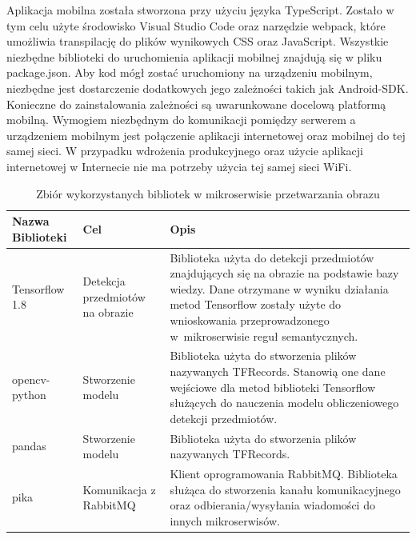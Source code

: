 Aplikacja mobilna została stworzona przy użyciu języka TypeScript. Zostało w tym celu użyte środowisko Visual Studio Code oraz narzędzie webpack, które umożliwia transpilację do plików wynikowych CSS oraz JavaScript. Wszystkie niezbędne biblioteki do uruchomienia aplikacji mobilnej znajdują się w pliku package.json. Aby kod mógł zostać uruchomiony na urządzeniu mobilnym, niezbędne jest dostarczenie dodatkowych jego zależności takich jak Android-SDK. Konieczne do zainstalowania zależności są uwarunkowane docelową platformą mobilną. Wymogiem niezbędnym do komunikacji pomiędzy serwerem a urządzeniem mobilnym jest połączenie aplikacji internetowej oraz mobilnej do tej samej sieci. W przypadku wdrożenia produkcyjnego oraz użycie aplikacji internetowej w Internecie nie ma potrzeby użycia tej samej sieci WiFi.
\newpage


\begin{center}
	\begin{longtable}{ | p{3.1cm} | p{4cm} | p{6.5cm} |}
		\caption{Zbiór wykorzystanych bibliotek w mikroserwisie przetwarzania obrazu}
		\label{librariesPython} \\
		\hline Nazwa \newline Biblioteki & Cel & Opis \\ \hline    
		
		\hline Tensorflow 1.8 &
		Detekcja przedmiotów na obrazie
		
		& Biblioteka użyta do detekcji przedmiotów znajdujących się na obrazie na podstawie bazy wiedzy. Dane otrzymane w wyniku działania metod Tensorflow zostały użyte do wnioskowania przeprowadzonego w~mikroserwisie reguł semantycznych.\\ \hline


	\hline opencv-python &
	Stworzenie modelu
	
	& Biblioteka użyta do stworzenia plików nazywanych TFRecords. Stanowią one dane wejściowe dla metod biblioteki Tensorflow służących do nauczenia modelu obliczeniowego detekcji przedmiotów.\\ \hline	
	
	\hline pandas &
	Stworzenie modelu
	
	& Biblioteka użyta do stworzenia plików nazywanych TFRecords.\\ \hline	
	
	\hline pika &
	Komunikacja z \newline RabbitMQ
	
	& Klient oprogramowania RabbitMQ. Biblioteka służąca do stworzenia kanału komunikacyjnego oraz odbierania/wysyłania wiadomości do innych mikroserwisów.\\ \hline	
	
	\end{longtable}
\end{center}


